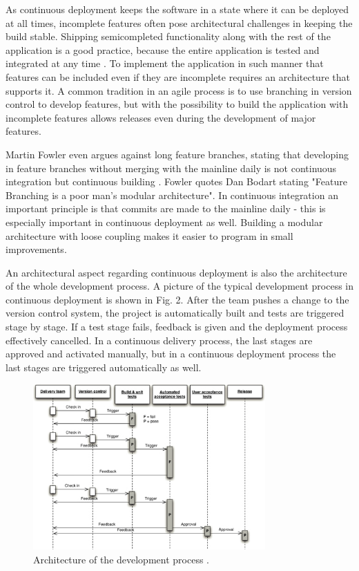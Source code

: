 \documentclass[conference]{IEEEtran}
\begin{document}
As continuous deployment keeps the software in a state where it can be deployed at all times, incomplete features often pose architectural challenges in keeping the build stable. Shipping semicompleted functionality along with the rest of the application is a good practice, because the entire application is tested and integrated at any time \cite{cdbook}. To implement the application in such manner that features can be included even if they are incomplete requires an architecture that supports it. A common tradition in an agile process is to use branching in version control to develop features, but with the possibility to build the application with incomplete features allows releases even during the development of major features. 

Martin Fowler even argues against long feature branches, stating that developing in feature branches without merging with the mainline daily is not continuous integration but continuous building \cite{mf}. Fowler quotes Dan Bodart stating "Feature Branching is a poor man's modular architecture". In continuous integration an important principle is that commits are made to the mainline daily - this is especially important in continuous deployment as well. Building a modular architecture with loose coupling makes it easier to program in small improvements.

An architectural aspect regarding continuous deployment is also the architecture of the whole development process. A picture of the typical development process in continuous deployment is shown in Fig. 2. After the team pushes a change to the version control system, the project is automatically built and tests are triggered stage by stage. If a test stage fails, feedback is given and the deployment process effectively cancelled. In a continuous delivery process, the last stages are approved and activated manually, but in a continuous deployment process the last stages are triggered automatically as well.

\begin{figure}[!t]
	\centering
	\includegraphics[width=3.5in]{developmentprocess.jpg}
	\caption{Architecture of the development process \cite{cdbook}.}
	\label{fig1}
\end{figure}
\end{document}
